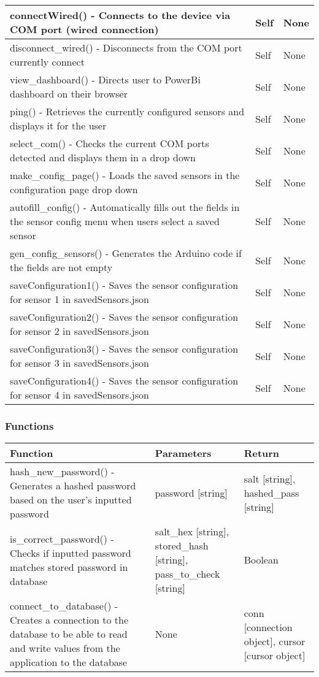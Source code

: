 \documentclass[12pt, titlepage]{article}
\begin{document}
\begin{tabular}{| p{} | p{}| p{}|}
        \hline
        connectWired() - Connects to the device via COM port (wired connection) & Self & None\\
        \hline
        disconnect\_wired() - Disconnects from the COM port currently connect & Self & None\\
        \hline
        view\_dashboard() - Directs user to PowerBi dashboard on their browser & Self & None\\
        \hline
        ping() - Retrieves the currently configured sensors and displays it for the user & Self & None\\
        \hline
        select\_com() - Checks the current COM ports detected and displays them in a drop down & Self & None\\
        \hline
        make\_config\_page() - Loads the saved sensors in the configuration page drop down & Self & None\\
        \hline
        autofill\_config() - Automatically fills out the fields in the sensor config menu when users select a saved sensor & Self & None\\
        \hline
        gen\_config\_sensors() - Generates the Arduino code if the fields are not empty & Self & None\\
        \hline
        saveConfiguration1() - Saves the sensor configuration for sensor 1 in savedSensors.json & Self & None\\
        \hline
        saveConfiguration2() - Saves the sensor configuration for sensor 2 in savedSensors.json & Self & None\\
        \hline
        saveConfiguration3() - Saves the sensor configuration for sensor 3 in savedSensors.json & Self & None\\
        \hline
        saveConfiguration4() - Saves the sensor configuration for sensor 4 in savedSensors.json & Self & None\\
        \hline
      \end{tabular}

  \subsubsection{Functions}
    \noindent \begin{tabular}{| p{} | p{}| p{}|}
      \hline
      \rowcolor[gray]{0.9}
      Function & Parameters & Return\\
      \hline
      hash\_new\_password() - Generates a hashed password based on the user’s inputted password & password [string] & salt [string], hashed\_pass [string] \\
      \hline
      is\_correct\_password() - Checks if inputted password matches stored password in database & salt\_hex [string], stored\_hash [string], pass\_to\_check [string] & Boolean \\
      \hline
      connect\_to\_database() - Creates a connection to the database to be able to read and write values from the application to the database & None & conn [connection object], cursor [cursor object] \\
      \hline
    \end{tabular}
\end{document}
